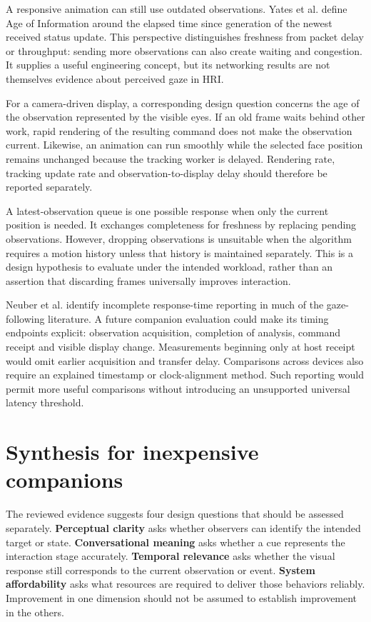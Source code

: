 \documentclass[11pt,a4paper]{article}
\begin{document}
A responsive animation can still use outdated observations. Yates et al. \cite{r12} define Age of Information around the elapsed time since generation of the newest received status update. This perspective distinguishes freshness from packet delay or throughput: sending more observations can also create waiting and congestion. It supplies a useful engineering concept, but its networking results are not themselves evidence about perceived gaze in HRI.

For a camera-driven display, a corresponding design question concerns the age of the observation represented by the visible eyes. If an old frame waits behind other work, rapid rendering of the resulting command does not make the observation current. Likewise, an animation can run smoothly while the selected face position remains unchanged because the tracking worker is delayed. Rendering rate, tracking update rate and observation-to-display delay should therefore be reported separately.

A latest-observation queue is one possible response when only the current position is needed. It exchanges completeness for freshness by replacing pending observations. However, dropping observations is unsuitable when the algorithm requires a motion history unless that history is maintained separately. This is a design hypothesis to evaluate under the intended workload, rather than an assertion that discarding frames universally improves interaction.

Neuber et al. \cite{r2} identify incomplete response-time reporting in much of the gaze-following literature. A future companion evaluation could make its timing endpoints explicit: observation acquisition, completion of analysis, command receipt and visible display change. Measurements beginning only at host receipt would omit earlier acquisition and transfer delay. Comparisons across devices also require an explained timestamp or clock-alignment method. Such reporting would permit more useful comparisons without introducing an unsupported universal latency threshold.

\section{Synthesis for inexpensive companions}

The reviewed evidence suggests four design questions that should be assessed separately. \textbf{Perceptual clarity} asks whether observers can identify the intended target or state. \textbf{Conversational meaning} asks whether a cue represents the interaction stage accurately. \textbf{Temporal relevance} asks whether the visual response still corresponds to the current observation or event. \textbf{System affordability} asks what resources are required to deliver those behaviors reliably. Improvement in one dimension should not be assumed to establish improvement in the others.
\end{document}
